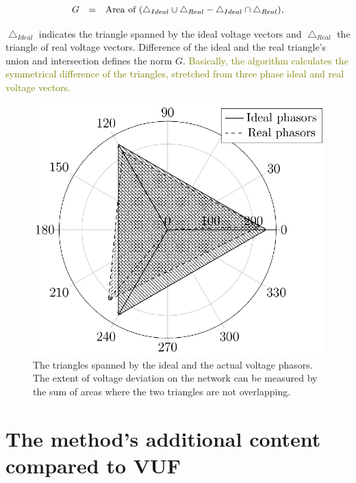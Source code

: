             \begin{equation}
                \begin{array}{rcl}
                       G&=&\textnormal{Area of }(\bigtriangleup_{Ideal}\cup\bigtriangleup_{Real}-\bigtriangleup_{Ideal}\cap\bigtriangleup_{Real}),
                \end{array}
                \label{equ:geom}
            \end{equation}

            $\bigtriangleup_{Ideal}$ indicates the triangle spanned by the ideal voltage vectors and $\bigtriangleup_{Real}$ the triangle of real voltage vectors. Difference of the ideal and the real triangle's union and intersection defines the norm $G$. \textcolor{olive}{Basically, the algorithm calculates the symmetrical difference of the triangles, stretched from three phase ideal and real voltage vectors.}

            \begin{figure}[!ht]
           \centering
           \includegraphics[scale=0.95]{Unblance_EPS_Pics/UnbalRedComp_JCP-figure1.eps}
           \caption{The triangles spanned by the ideal and the actual voltage phasors. The extent of voltage deviation on the network can be measured by the sum of areas where the two triangles are not overlapping.}
           \label{fig:threephase}
            \end{figure}

\section{The method's additional content compared to VUF}

